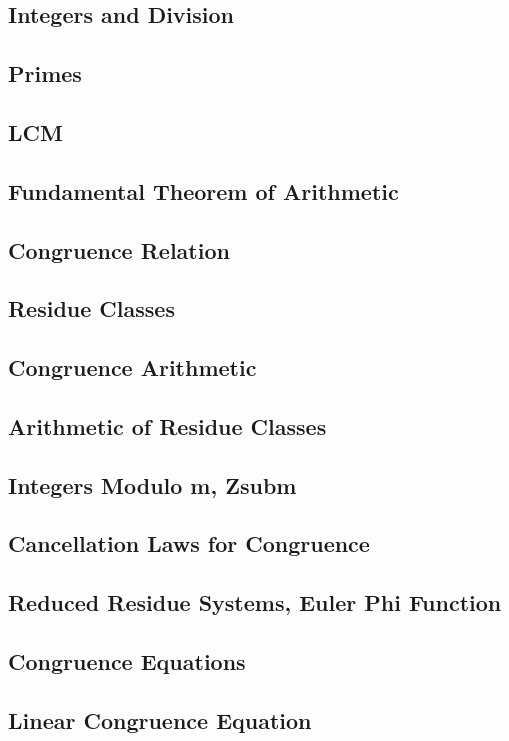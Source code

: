 \documentclass[11pt]{book} %
\theoremstyle {definition}
\theoremstyle {remark}
\begin{document}
\subsection {Integers and Division}
\subsection {Primes}
\subsection {LCM}
\subsection {Fundamental Theorem of Arithmetic}
\subsection {Congruence Relation}
\subsection {Residue Classes}
\subsection {Congruence Arithmetic}
\subsection {Arithmetic of Residue Classes}
\subsection {Integers Modulo m, Zsubm}
\subsection {Cancellation Laws for Congruence}
\subsection {Reduced Residue Systems, Euler Phi Function}
\subsection {Congruence Equations}
    \subsection {Linear Congruence Equation}
\end{document}
